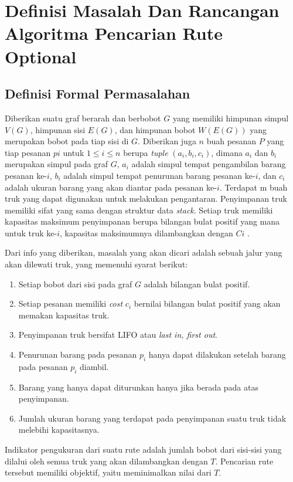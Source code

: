 \chapter{Definisi Masalah Dan Rancangan Algoritma Pencarian Rute Optional}

\section{Definisi Formal Permasalahan}

Diberikan suatu graf berarah dan berbobot $G$ yang memiliki himpunan simpul $V(G)$, himpunan sisi $E(G)$, dan himpunan bobot $W(E(G))$ yang merupakan 
bobot pada tiap sisi di $G$. Diberikan juga $n$ buah pesanan $P$ yang tiap pesanan $pi$ untuk $1 \leq i \leq n$ berupa \textit{tuple} $(a_{i}, b_{i}, c_{i})$, 
dimana $a_{i}$ dan $b_{i}$ merupakan simpul pada graf $G$, $a_{i}$ adalah simpul tempat pengambilan barang pesanan ke-$i$, $b_{i}$ adalah simpul tempat penurunan 
barang pesanan ke-$i$, dan $c_{i}$ adalah ukuran barang yang akan diantar pada pesanan ke-$i$. Terdapat m buah truk yang dapat digunakan untuk melakukan pengantaran.
Penyimpanan truk memiliki sifat yang sama dengan struktur data \textit{stack}. Setiap truk memiliki kapasitas maksimum penyimpanan 
berupa bilangan bulat positif yang mana untuk truk ke-$i$, kapasitas maksimumnya dilambangkan dengan $Ci$ .

Dari info yang diberikan, masalah yang akan dicari adalah sebuah jalur yang akan dilewati truk, yang memenuhi syarat berikut:
\begin{enumerate}
    \item Setiap bobot dari sisi pada graf $G$ adalah bilangan bulat positif.
    \item Setiap pesanan memiliki \textit{cost} $c_{i}$ bernilai bilangan bulat positif yang akan memakan kapasitas truk.
    \item Penyimpanan truk bersifat LIFO atau \textit{last in, first out}.
    \item Penurunan barang pada pesanan $p_{i}$ hanya dapat dilakukan setelah barang pada pesanan $p_{i}$ diambil.
    \item Barang yang hanya dapat diturunkan hanya jika berada pada atas penyimpanan.
    \item Jumlah ukuran barang yang terdapat pada penyimpanan suatu truk tidak melebihi kapasitasnya.
\end{enumerate}

Indikator pengukuran dari suatu rute adalah jumlah bobot dari sisi-sisi yang dilalui oleh semua truk yang akan dilambangkan dengan $T$. 
Pencarian rute tersebut memiliki objektif, yaitu meminimalkan nilai dari $T$.

